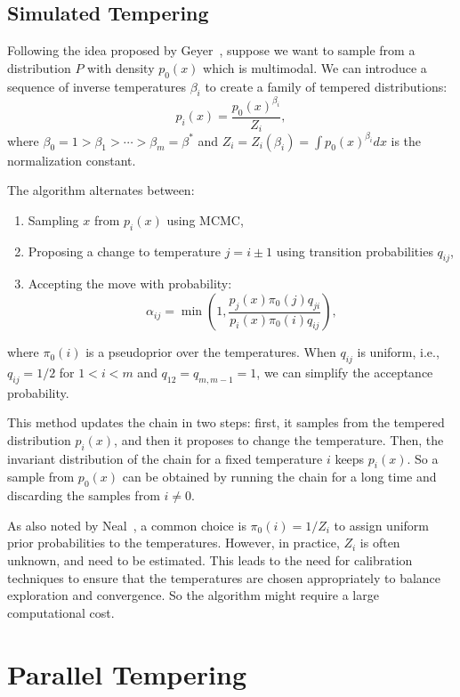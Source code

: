 \documentclass[11pt]{article}
\begin{document}
\subsection{Simulated Tempering}

Following the idea proposed by Geyer~\citep{geyer1995annealing}, suppose we want to sample from a 
distribution $P$ with density $p_0(x)$ which is multimodal. We can introduce a sequence of inverse 
temperatures $\beta_i$ to create a family of tempered distributions:
\[
    p_i(x) = \frac{p_0(x)^{\beta_i}}{Z_i},
\]
where $\beta_0 = 1 > \beta_1 > \cdots > \beta_m = \beta^*$ and $Z_i = Z_i(\beta_i) = 
\int p_0(x)^{\beta_i} dx$ is the normalization constant.

The algorithm alternates between:
\begin{enumerate}
    \item Sampling $x$ from $p_i(x)$ using MCMC,
    \item Proposing a change to temperature $j = i \pm 1$ using transition probabilities $q_{ij}$,
    \item Accepting the move with probability:
    \[
        \alpha_{ij} = \min\left(1, \frac{p_j(x)\pi_0(j) q_{ji} }{p_i(x)\pi_0(i) q_{ij} }\right),
    \]
\end{enumerate}
where $\pi_0(i)$ is a pseudoprior over the temperatures. When $q_{ij}$ is
uniform, i.e., $q_{ij} = 1/2$ for $1 < i < m$ and $q_{12} = q_{m,m-1} = 1$, we can simplify the
acceptance probability.

This method updates the chain in two steps: first, it samples from the tempered distribution
$p_i(x)$, and then it proposes to change the temperature. Then, the invariant distribution of the
chain for a fixed temperature $i$ keeps $p_i(x)$. So a sample from $p_0(x)$ can be obtained by
running the chain for a long time and discarding the samples from $i \neq 0$.

As also noted by Neal~\citep{neal1996sampling}, a common choice is $\pi_0(i) = 1/Z_i$ to assign 
uniform prior probabilities to the temperatures. However, in practice, $Z_i$ is often unknown, and
need to be estimated. This leads to the need for calibration techniques to ensure that the 
temperatures are chosen appropriately to balance exploration and convergence. So the algorithm might
require a large computational cost.

\section{Parallel Tempering}
\end{document}
